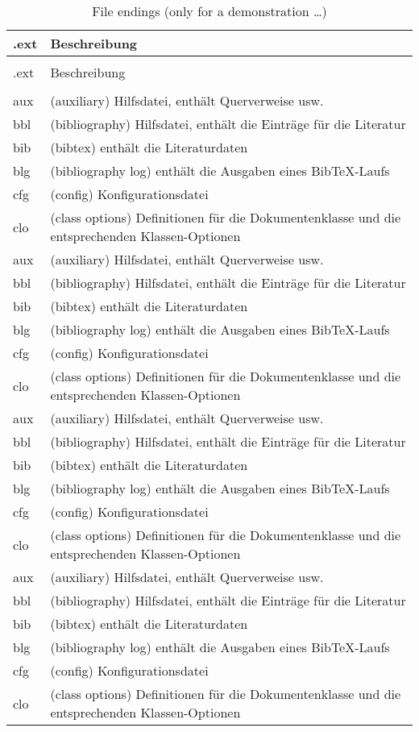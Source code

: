 \documentclass[paper=a4,fontsize=11pt,DIV=13,parskip=half-,
               captions=tableabove,twoside=on]{scrartcl}
\begin{document}
\begin{xltabular}{\linewidth}{@{} >{\ttfamily}l >{\RaggedRight}X @{}}
\caption{File endings (only for a demonstration \ldots)}\\\hline
.ext & Beschreibung\\\hline
\endfirsthead
{}\\\hline
.ext & Beschreibung\\\hline
\endhead
\hline
{}\\
\endfoot
\hline
\endlastfoot
 aux &  (auxiliary) Hilfsdatei, enthält Querverweise usw. \\ 
 bbl &  (bibliography) Hilfsdatei, enthält die Einträge für die Literatur\\ 
 bib &  (bibtex) enthält die Literaturdaten\\ 
 blg &  (bibliography log) enthält die Ausgaben eines Bib\TeX-Laufs\\ 
 cfg &  (config) Konfigurationsdatei\\ 
 clo &  (class options) Definitionen für die Dokumentenklasse und die entsprechenden
  Klassen-Optionen\\ 
 aux &  (auxiliary) Hilfsdatei, enthält Querverweise usw. \\ 
 bbl &  (bibliography) Hilfsdatei, enthält die Einträge für die Literatur\\ 
 bib &  (bibtex) enthält die Literaturdaten\\ 
 blg &  (bibliography log) enthält die Ausgaben eines Bib\TeX-Laufs\\ 
 cfg &  (config) Konfigurationsdatei\\ 
 clo &  (class options) Definitionen für die Dokumentenklasse und die entsprechenden
  Klassen-Optionen\\ 
 aux &  (auxiliary) Hilfsdatei, enthält Querverweise usw. \\ 
 bbl &  (bibliography) Hilfsdatei, enthält die Einträge für die Literatur\\ 
 bib &  (bibtex) enthält die Literaturdaten\\ 
 blg &  (bibliography log) enthält die Ausgaben eines Bib\TeX-Laufs\\ 
 cfg &  (config) Konfigurationsdatei\\ 
 clo &  (class options) Definitionen für die Dokumentenklasse und die entsprechenden
  Klassen-Optionen\\ 
 aux &  (auxiliary) Hilfsdatei, enthält Querverweise usw. \\ 
 bbl &  (bibliography) Hilfsdatei, enthält die Einträge für die Literatur\\ 
 bib &  (bibtex) enthält die Literaturdaten\\ 
 blg &  (bibliography log) enthält die Ausgaben eines Bib\TeX-Laufs\\ 
 cfg &  (config) Konfigurationsdatei\\ 
 clo &  (class options) Definitionen für die Dokumentenklasse und die entsprechenden
  Klassen-Optionen\\ 
\end{xltabular}



\nocite{*}
\printbibliography
\end{document}
